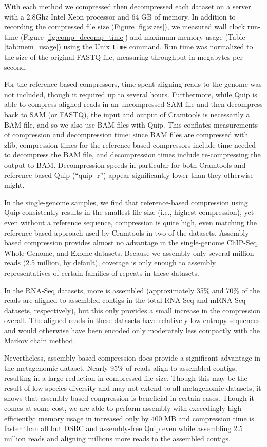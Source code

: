 \documentclass[a4,center,fleqn]{NAR}
\begin{document}
With each method we compressed then decompressed each dataset on a server with
a 2.8Ghz Intel Xeon processor and 64 GB of memory. In addition to recording
the compressed file size (Figure \ref{fig:sizes}), we measured wall clock
run-time (Figure \ref{fig:comp_decomp_time}) and maximum memory usage (Table
\ref{tab:mem_usage}) using the Unix \texttt{time} command. Run time was 
normalized to the size of the original FASTQ file, measuring throughput in
megabytes per second.

For the reference-based compressors, time spent aligning reads to the genome
was not included, though it required up to several hours. Furthermore, while
Quip is able to compress aligned reads in an uncompressed SAM file and then
decompress back to SAM (or FASTQ), the input and output of Cramtools is
necessarily a BAM file, and so we also use BAM files with Quip. This conflates
measurements of compression and decompression time: since BAM files are compressed
with zlib, compression times for the reference-based compressors include time
needed to decompress the BAM file, and decompression times include
re-compressing the output to BAM. Decompression speeds in particular for both
Cramtools and reference-based Quip (``quip -r'') appear significantly lower
than they otherwise might.

In the single-genome samples, we find that reference-based compression using
Quip consistently results in the smallest file size (i.e., highest
compression), yet even without a reference sequence, compression is quite high,
even matching the reference-based approach used by Cramtools in two of the
datasets. Assembly-based compression provides almost no advantage in the
single-genome ChIP-Seq, Whole Genome, and Exome datasets. Because we assembly
only several million reads (2.5 million, by default), coverage is only enough
to assembly representatives of certain families of repeats in these datasets.

In the RNA-Seq datasets, more is assembled (approximately 35\% and 70\% of the
reads are aligned to assembled contigs in the total RNA-Seq and mRNA-Seq
datasets, respectively), but this only provides a small increase in the
compression overall. The aligned reads in these datasets have relatively
low-entropy sequences and would otherwise have been encoded only moderately less
compactly with the Markov chain method.

Nevertheless, assembly-based compression does provide a significant advantage
in the metagenomic dataset. Nearly 95\% of reads align to assembled contigs,
resulting in a large reduction in compressed file size. Though this may be the
result of low species diversity and may not extend to all metagenomic
datasets, it shows that assembly-based compression is beneficial in certain
cases. Though it comes at some cost, we are able to perform assembly with
exceedingly  high efficiently: memory usage in increased only by 400 MB and
compression time is faster than all but DSRC and assembly-free Quip even while
assembling 2.5 million reads and aligning millions more reads to the assembled
contigs.
\end{document}
